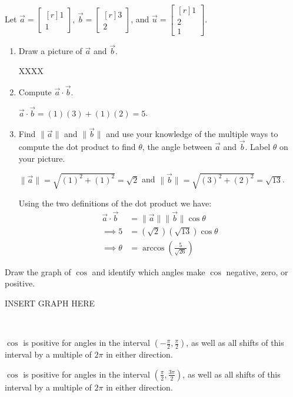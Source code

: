\documentclass{problemset}
\newcommand{\mat}[1]{\begin{bmatrix*}[r]#1\end{bmatrix*}}
\begin{document}
	\question
		Let $\vec a=\mat{1\\1}$, $\vec b=\mat{3\\2}$, and $\vec u=\mat{1\\2\\1}$.
	\begin{parts}
		\item 
		\begin{enumerate}	
			\item Draw a picture of $\vec a $ and $\vec b$.
				\begin{solution}
					XXXX
				\end{solution}
			\item Compute $\vec a\cdot \vec b$.
				\begin{solution}[inline]
					$\vec a\cdot \vec b = (1)(3) + (1)(2) = 5$.
				\end{solution}
			\item Find $\|\vec a\|$ and $\|\vec b\|$ and use your knowledge of
			the multiple ways to compute the dot product to find $\theta$,
			the angle between $\vec a$ and $\vec b$. Label $\theta$ on your picture.
				\begin{solution}
					$\|\vec a\| = \sqrt{(1)^2 + (1)^2} = \sqrt{2}$ and 
					$\|\vec b\| = \sqrt{(3)^2 + (2)^2} = \sqrt{13}$.

					Using the two definitions of the dot product we have:
					\begin{align*}
						\vec a\cdot \vec b &= \|\vec a\|\|\vec b\|\cos \theta \\
						\implies 5 &= (\sqrt{2})(\sqrt{13}) \cos \theta \\
						\implies \theta &= \arccos\left( \frac{5}{\sqrt{26}}\right)
					\end{align*}
				\end{solution}
		\end{enumerate}
		\item Draw the graph of $\cos$ and identify which angles make $\cos$ 
			negative, zero,	or positive.
			\begin{solution}
				INSERT GRAPH HERE

				\

				$\cos$ is positive for angles in the interval $\left(-\frac{\pi}{2},\frac{\pi}{2}\right)$,
				as well as all shifts of this interval by a multiple of $2\pi$ in
				either direction. 

				$\cos$ is positive for angles in the interval $\left(\frac{\pi}{2},\frac{3\pi}{2}\right)$,
				as well as all shifts of this interval by a multiple of $2\pi$ in
				either direction.  
			\end{solution}


\end{parts}
\end{document}
